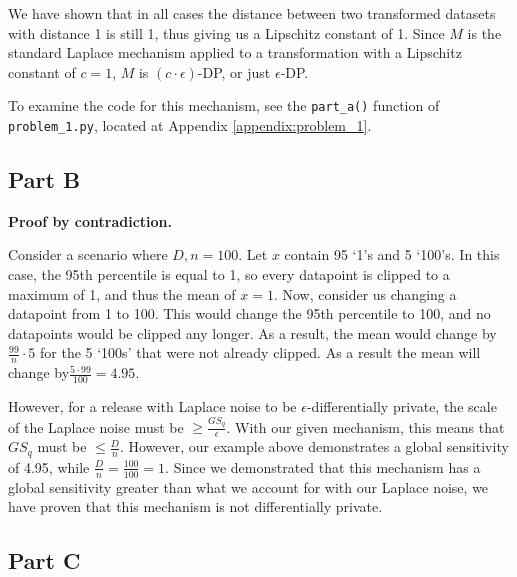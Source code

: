 \documentclass[12pt]{article}
\def\cl{\lstinline}
\begin{document}
\medskip

We have shown that in all cases the distance between two transformed datasets with distance 1 is still 1, thus giving us a Lipschitz constant of 1. Since $M$ is the standard Laplace mechanism applied to a transformation with a Lipschitz constant of $c = 1$, $M$ is $(c \cdot \epsilon)$-DP, or just $\epsilon$-DP.

\medskip

To examine the code for this mechanism, see the \cl{part_a()} function of \cl{problem_1.py}, located at Appendix \ref{appendix:problem_1}.

\subsection{Part B}

\noindent

\textbf{Proof by contradiction.}

\bigskip

Consider a scenario where $D, n = 100$. Let $x$ contain 95 `1's and 5 `100's. In this case, the 95th percentile is equal to 1, so every datapoint is clipped to a maximum of 1, and thus the mean of $x = 1$. Now, consider us changing a datapoint from 1 to 100. This would change the 95th percentile to 100, and no datapoints would be clipped any longer. As a result, the mean would change by $\frac{99}{n} \cdot 5$ for the 5 `100s' that were not already clipped. As a result the mean will change by$\frac{5 \cdot 99}{100} = 4.95$.

\medskip

However, for a release with Laplace noise to be $\epsilon$-differentially private, the scale of the Laplace noise must be $\geq \frac{GS_q}{\epsilon}$. With our given mechanism, this means that $GS_q$ must be $\leq \frac{D}{n}$. However, our example above demonstrates a global sensitivity of 4.95, while $\frac{D}{n} = \frac{100}{100} = 1$. Since we demonstrated that this mechanism has a global sensitivity greater than what we account for with our Laplace noise, we have proven that this mechanism is not differentially private.

\subsection{Part C}

\noindent
\end{document}
